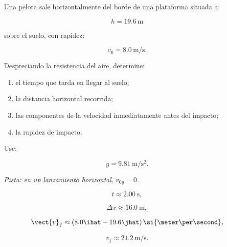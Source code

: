 \begin{ejercicio}
Una pelota sale horizontalmente del borde de una plataforma situada a:

\[
h=\SI{19.6}{\meter}
\]

sobre el suelo, con rapidez:

\[
v_0=\SI{8.0}{\meter\per\second}.
\]

Despreciando la resistencia del aire, determine:

\begin{enumerate}[label=\alph*)]
    \item el tiempo que tarda en llegar al suelo;
    \item la distancia horizontal recorrida;
    \item las componentes de la velocidad inmediatamente antes del impacto;
    \item la rapidez de impacto.
\end{enumerate}

Use:

\[
g=\SI{9.81}{\meter\per\second\squared}.
\]

\textit{Pista: en un lanzamiento horizontal, \(v_{0y}=0\).}
\end{ejercicio}

\begin{respuesta}
\[
t\approx\SI{2.00}{\second},
\]

\[
\Delta x\approx\SI{16.0}{\meter},
\]

\[
\vect{v}_f
\approx
(8.0\ihat-19.6\jhat)
\,\si{\meter\per\second},
\]

\[
\boxed{
v_f\approx\SI{21.2}{\meter\per\second}
}.
\]
\end{respuesta}

